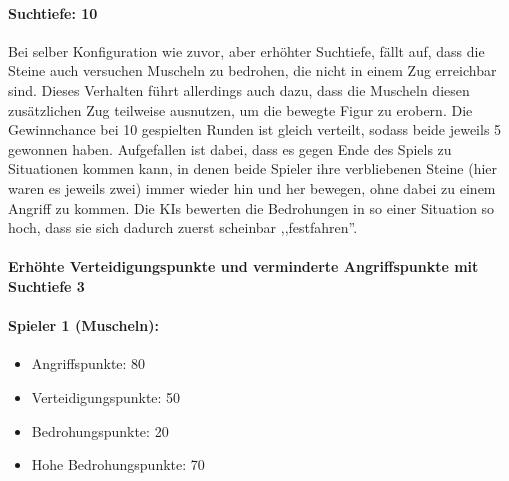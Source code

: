 \paragraph{Suchtiefe: 10}
Bei selber Konfiguration wie zuvor, aber erhöhter Suchtiefe, fällt auf, dass die Steine  auch versuchen Muscheln zu bedrohen, die nicht in einem Zug erreichbar sind. Dieses Verhalten führt allerdings auch dazu, dass die Muscheln diesen zusätzlichen Zug teilweise ausnutzen, um die bewegte Figur zu erobern. Die Gewinnchance bei 10 gespielten Runden ist gleich verteilt, sodass beide jeweils 5 gewonnen haben. Aufgefallen ist dabei, dass es gegen Ende des Spiels zu Situationen kommen kann, in denen beide Spieler ihre verbliebenen Steine (hier waren es jeweils zwei) immer wieder hin und her bewegen, ohne dabei zu einem Angriff zu kommen. Die KIs bewerten die Bedrohungen in so einer Situation so hoch, dass sie sich dadurch zuerst scheinbar ,,festfahren''.
\paragraph{Erhöhte Verteidigungspunkte und verminderte Angriffspunkte mit Suchtiefe 3}
\paragraph{Spieler 1 (Muscheln):}
\begin{itemize}
	\item Angriffspunkte: 80
	\item Verteidigungspunkte: 50
	\item Bedrohungspunkte: 20
	\item Hohe Bedrohungspunkte: 70
\end{itemize}

